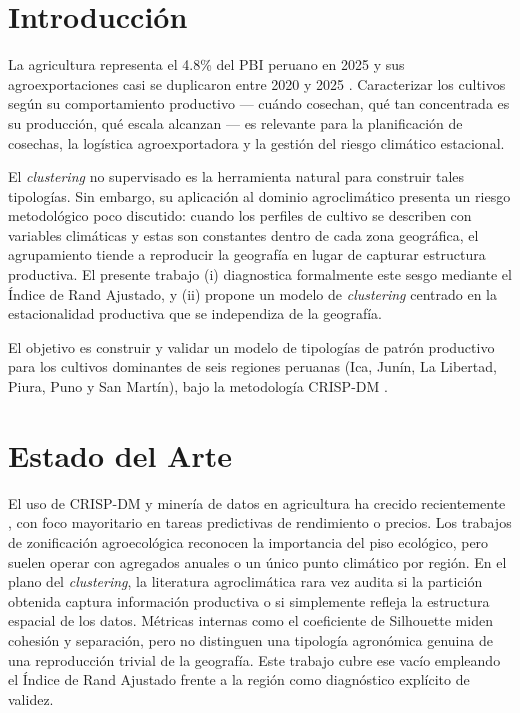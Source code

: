 \documentclass[conference]{IEEEtran}
\begin{document}
\section{Introducción}
La agricultura representa el 4.8\% del PBI peruano en 2025 \cite{bcrp2025} y sus agroexportaciones casi se duplicaron entre 2020 y 2025 \cite{adex2026}. Caracterizar los cultivos según su comportamiento productivo --- cuándo cosechan, qué tan concentrada es su producción, qué escala alcanzan --- es relevante para la planificación de cosechas, la logística agroexportadora y la gestión del riesgo climático estacional.

El \textit{clustering} no supervisado es la herramienta natural para construir tales tipologías. Sin embargo, su aplicación al dominio agroclimático presenta un riesgo metodológico poco discutido: cuando los perfiles de cultivo se describen con variables climáticas y estas son constantes dentro de cada zona geográfica, el agrupamiento tiende a reproducir la geografía en lugar de capturar estructura productiva. El presente trabajo (i) diagnostica formalmente este sesgo mediante el Índice de Rand Ajustado, y (ii) propone un modelo de \textit{clustering} centrado en la estacionalidad productiva que se independiza de la geografía.

El objetivo es construir y validar un modelo de tipologías de patrón productivo para los cultivos dominantes de seis regiones peruanas (Ica, Junín, La Libertad, Piura, Puno y San Martín), bajo la metodología CRISP-DM \cite{inia2019, chapman2000}.

\section{Estado del Arte}
El uso de CRISP-DM y minería de datos en agricultura ha crecido recientemente \cite{chapapria2024, canchano2024}, con foco mayoritario en tareas predictivas de rendimiento o precios. Los trabajos de zonificación agroecológica \cite{midagri2025, una2023} reconocen la importancia del piso ecológico, pero suelen operar con agregados anuales o un único punto climático por región. En el plano del \textit{clustering}, la literatura agroclimática rara vez audita si la partición obtenida captura información productiva o si simplemente refleja la estructura espacial de los datos. Métricas internas como el coeficiente de Silhouette miden cohesión y separación, pero no distinguen una tipología agronómica genuina de una reproducción trivial de la geografía. Este trabajo cubre ese vacío empleando el Índice de Rand Ajustado frente a la región como diagnóstico explícito de validez.
\end{document}
